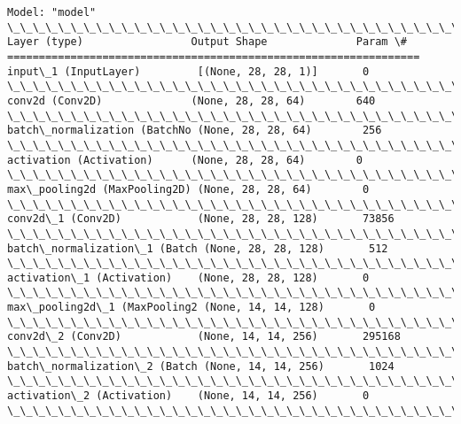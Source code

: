\documentclass[11pt]{article}
\begin{document}
    \begin{Verbatim}[commandchars=\\\{\}]
Model: "model"
\_\_\_\_\_\_\_\_\_\_\_\_\_\_\_\_\_\_\_\_\_\_\_\_\_\_\_\_\_\_\_\_\_\_\_\_\_\_\_\_\_\_\_\_\_\_\_\_\_\_\_\_\_\_\_\_\_\_\_\_\_\_\_\_\_
Layer (type)                 Output Shape              Param \#
=================================================================
input\_1 (InputLayer)         [(None, 28, 28, 1)]       0
\_\_\_\_\_\_\_\_\_\_\_\_\_\_\_\_\_\_\_\_\_\_\_\_\_\_\_\_\_\_\_\_\_\_\_\_\_\_\_\_\_\_\_\_\_\_\_\_\_\_\_\_\_\_\_\_\_\_\_\_\_\_\_\_\_
conv2d (Conv2D)              (None, 28, 28, 64)        640
\_\_\_\_\_\_\_\_\_\_\_\_\_\_\_\_\_\_\_\_\_\_\_\_\_\_\_\_\_\_\_\_\_\_\_\_\_\_\_\_\_\_\_\_\_\_\_\_\_\_\_\_\_\_\_\_\_\_\_\_\_\_\_\_\_
batch\_normalization (BatchNo (None, 28, 28, 64)        256
\_\_\_\_\_\_\_\_\_\_\_\_\_\_\_\_\_\_\_\_\_\_\_\_\_\_\_\_\_\_\_\_\_\_\_\_\_\_\_\_\_\_\_\_\_\_\_\_\_\_\_\_\_\_\_\_\_\_\_\_\_\_\_\_\_
activation (Activation)      (None, 28, 28, 64)        0
\_\_\_\_\_\_\_\_\_\_\_\_\_\_\_\_\_\_\_\_\_\_\_\_\_\_\_\_\_\_\_\_\_\_\_\_\_\_\_\_\_\_\_\_\_\_\_\_\_\_\_\_\_\_\_\_\_\_\_\_\_\_\_\_\_
max\_pooling2d (MaxPooling2D) (None, 28, 28, 64)        0
\_\_\_\_\_\_\_\_\_\_\_\_\_\_\_\_\_\_\_\_\_\_\_\_\_\_\_\_\_\_\_\_\_\_\_\_\_\_\_\_\_\_\_\_\_\_\_\_\_\_\_\_\_\_\_\_\_\_\_\_\_\_\_\_\_
conv2d\_1 (Conv2D)            (None, 28, 28, 128)       73856
\_\_\_\_\_\_\_\_\_\_\_\_\_\_\_\_\_\_\_\_\_\_\_\_\_\_\_\_\_\_\_\_\_\_\_\_\_\_\_\_\_\_\_\_\_\_\_\_\_\_\_\_\_\_\_\_\_\_\_\_\_\_\_\_\_
batch\_normalization\_1 (Batch (None, 28, 28, 128)       512
\_\_\_\_\_\_\_\_\_\_\_\_\_\_\_\_\_\_\_\_\_\_\_\_\_\_\_\_\_\_\_\_\_\_\_\_\_\_\_\_\_\_\_\_\_\_\_\_\_\_\_\_\_\_\_\_\_\_\_\_\_\_\_\_\_
activation\_1 (Activation)    (None, 28, 28, 128)       0
\_\_\_\_\_\_\_\_\_\_\_\_\_\_\_\_\_\_\_\_\_\_\_\_\_\_\_\_\_\_\_\_\_\_\_\_\_\_\_\_\_\_\_\_\_\_\_\_\_\_\_\_\_\_\_\_\_\_\_\_\_\_\_\_\_
max\_pooling2d\_1 (MaxPooling2 (None, 14, 14, 128)       0
\_\_\_\_\_\_\_\_\_\_\_\_\_\_\_\_\_\_\_\_\_\_\_\_\_\_\_\_\_\_\_\_\_\_\_\_\_\_\_\_\_\_\_\_\_\_\_\_\_\_\_\_\_\_\_\_\_\_\_\_\_\_\_\_\_
conv2d\_2 (Conv2D)            (None, 14, 14, 256)       295168
\_\_\_\_\_\_\_\_\_\_\_\_\_\_\_\_\_\_\_\_\_\_\_\_\_\_\_\_\_\_\_\_\_\_\_\_\_\_\_\_\_\_\_\_\_\_\_\_\_\_\_\_\_\_\_\_\_\_\_\_\_\_\_\_\_
batch\_normalization\_2 (Batch (None, 14, 14, 256)       1024
\_\_\_\_\_\_\_\_\_\_\_\_\_\_\_\_\_\_\_\_\_\_\_\_\_\_\_\_\_\_\_\_\_\_\_\_\_\_\_\_\_\_\_\_\_\_\_\_\_\_\_\_\_\_\_\_\_\_\_\_\_\_\_\_\_
activation\_2 (Activation)    (None, 14, 14, 256)       0
\_\_\_\_\_\_\_\_\_\_\_\_\_\_\_\_\_\_\_\_\_\_\_\_\_\_\_\_\_\_\_\_\_\_\_\_\_\_\_\_\_\_\_\_\_\_\_\_\_\_\_\_\_\_\_\_\_\_\_\_\_\_\_\_\_

\end{Verbatim}
\end{document}
